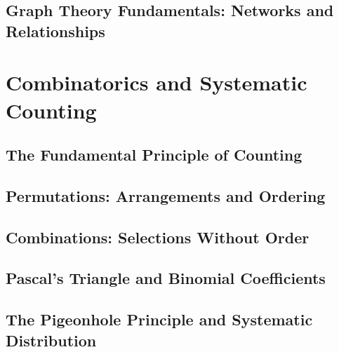 \documentclass[12pt, oneside, openany]{book}
\begin{document}
\section{Graph Theory Fundamentals: Networks and Relationships}


\chapter{Combinatorics and Systematic Counting}

\section{The Fundamental Principle of Counting}

\section{Permutations: Arrangements and Ordering}

\section{Combinations: Selections Without Order}

\section{Pascal's Triangle and Binomial Coefficients}

\section{The Pigeonhole Principle and Systematic Distribution}
\end{document}
